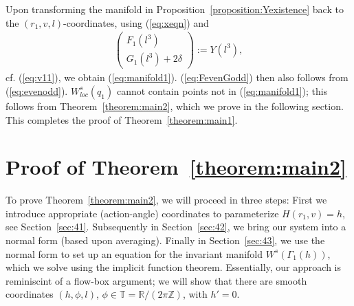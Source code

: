 \documentclass[reqno,12pt]{amsart}
\newcommand{\secref}[1]{Section~\ref{sec:#1}}
\newcommand{\seclab}[1]{\label{sec:#1}}
\renewcommand{\eqref}[1]{(\ref{eq:#1})}
\newcommand{\propref}[1]{Proposition~\ref{proposition:#1}}
\newcommand{\thmref}[1]{Theorem~\ref{theorem:#1}}
\newtheorem{lemma}[theorem]{Lemma}
\numberwithin{equation}{section}
\begin{document}
Upon transforming the manifold in \propref{Yexistence} back to the $(r_1,v,l)$-coordinates, using \eqref{xeqn} and
\begin{align*}
 \begin{pmatrix}
  F_1(l^3)\\
  G_1(l^3)+2\delta
 \end{pmatrix} := Y(l^3),
\end{align*}
cf. \eqref{v11}, 
we obtain \eqref{manifold1}. \eqref{FevenGodd} then also follows from \eqref{evenodd}. $W_{loc}^s(q_1)$ cannot contain points not in \eqref{manifold1}; this follows from \thmref{main2}, which we prove in the following section. This completes the proof of \thmref{main1}.
 

\section{Proof of \thmref{main2}}\seclab{main2}
To prove \thmref{main2}, we will proceed in three steps: First we introduce appropriate (action-angle) coordinates to parameterize $H(r_1,v)=h$, see \secref{41}. Subsequently in \secref{42}, we bring our system into a normal form (based upon averaging). Finally in \secref{43}, we use the normal form to set up an equation for the invariant manifold $W^s(\Gamma_1(h))$, which we solve using the implicit function theorem. Essentially, our approach is reminiscint of a flow-box argument; we will show that there are smooth coordinates $(h,\phi,l)$, $\phi\in \mathbb T=\mathbb R/(2\pi \mathbb Z)$, with $h'=0$. 
\end{document}

